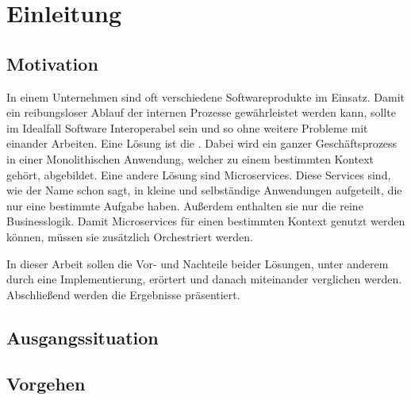 \chapter{Einleitung}
\label{chap:einleitung}

\section{Motivation}
In einem Unternehmen sind oft verschiedene Softwareprodukte im Einsatz. Damit ein reibungsloser Ablauf der internen Prozesse gewährleistet werden kann, sollte im Idealfall Software Interoperabel sein und so ohne weitere Probleme mit einander Arbeiten. Eine Lösung ist die \SOA. Dabei wird ein ganzer Geschäftsprozess in einer Monolithischen Anwendung, welcher zu einem bestimmten Kontext gehört, abgebildet. Eine andere Lösung sind Microservices. Diese Services sind, wie der Name schon sagt, in kleine und selbständige Anwendungen aufgeteilt, die nur eine bestimmte Aufgabe haben. Außerdem enthalten sie nur die reine Businesslogik. Damit Microservices für einen bestimmten Kontext genutzt werden können, müssen sie zusätzlich Orchestriert werden.

In dieser Arbeit sollen die Vor- und Nachteile beider Lösungen, unter anderem durch eine Implementierung, erörtert und danach miteinander verglichen werden. Abschließend werden die Ergebnisse präsentiert.

\section{Ausgangssituation}


\section{Vorgehen}